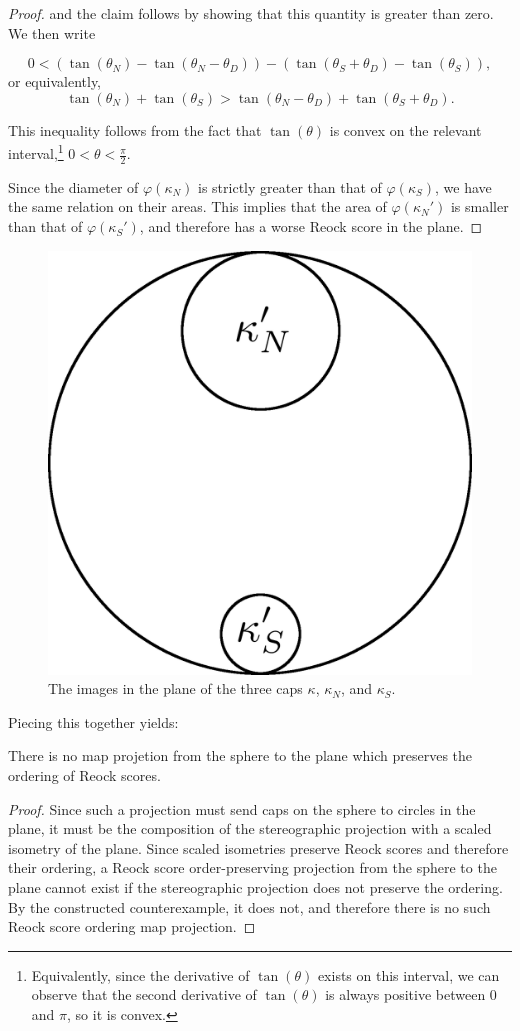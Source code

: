 \begin{proof}
and the claim follows by showing that this quantity is greater than zero.  We then write 

$$0< \left(\tan(\theta_N) - \tan(\theta_N-\theta_D)\right) - \left( \tan(\theta_S+\theta_D) - \tan(\theta_S) \right),$$
 or equivalently,
 $$\tan(\theta_N) + \tan(\theta_S) >   \tan(\theta_N-\theta_D) + \tan(\theta_S+\theta_D). $$

This inequality follows from the fact that $\tan(\theta)$ is convex on the relevant interval,\footnote{Equivalently, since the derivative of $\tan(\theta)$ exists on this interval, we can observe that the second derivative of $\tan(\theta)$ is always positive between $0$ and $\pi$, so it is convex.} $0<\theta<\tfrac{\pi}{2}$.

Since  the diameter of $\varphi(\kappa_N)$ is strictly {greater} than that of $\varphi(\kappa_S)$, we have the same relation on their areas.  This implies that the area of $\varphi(\kappa_N')$ is smaller than that of $\varphi(\kappa_S')$, and therefore has a worse Reock score in the plane. 
   
  
\end{proof}


\begin{figure}[h]
	\centering
	\includegraphics[width=.3\textwidth]{figs/differentkappa.png}
	\caption{The images in the plane of the three caps $\kappa$, $\kappa_N$, and $\kappa_S$.}
	\label{fig:reock_schema}
\end{figure}

Piecing this together yields:
\begin{theorem}
  There is no map projetion from the sphere to the plane which preserves the ordering of Reock scores.
\end{theorem}

\begin{proof}
	  Since such a projection must send caps on the sphere to circles in the
	plane, it must be the composition of the stereographic projection with
	a scaled isometry of the plane.  Since scaled isometries preserve
	Reock scores and therefore their ordering, a Reock score
	order-preserving projection from the sphere to the plane cannot exist
	if the stereographic projection does not preserve the ordering.  By
	the constructed counterexample, it does not, and therefore there is no
	such Reock score ordering map projection.
\end{proof}
